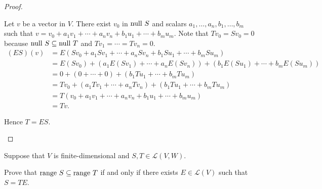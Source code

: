 \begin{proof}
\begin{enumerate}[label={\textbf{Step \arabic*.}},itemindent={1cm}]
              Let $v$ be a vector in $V$. There exist $v_{0}$ in $\operatorname{null}\,{S}$ and scalars $a_{1}, \ldots, a_{n}, b_{1}, \ldots, b_{m}$ such that $v = v_{0} + a_{1}v_{1} + \cdots + a_{n}v_{n} + b_{1}u_{1} + \cdots + b_{m}u_{m}$. Note that $Tv_{0} = Sv_{0} = 0$ because $\operatorname{null}\,{S}\subseteq \operatorname{null}\,{T}$ and $Tv_{1} = \cdots = Tv_{n} = 0$.
              \begin{align*}
                  (ES)(v) & = E(Sv_{0} + a_{1}Sv_{1} + \cdots + a_{n}Sv_{n} + b_{1}Su_{1} + \cdots + b_{m}Su_{m})                 \\
                          & = E(Sv_{0}) + (a_{1}E(Sv_{1}) + \cdots + a_{n}E(Sv_{n})) + (b_{1}E(Su_{1}) + \cdots + b_{m}E(Su_{m})) \\
                          & = 0 + (0 + \cdots + 0) + (b_{1}Tu_{1} + \cdots + b_{m}Tu_{m})                                         \\
                          & = Tv_{0} + (a_{1}Tv_{1} + \cdots + a_{n}Tv_{n}) + (b_{1}Tu_{1} + \cdots + b_{m}Tu_{m})                \\
                          & = T(v_{0} + a_{1}v_{1} + \cdots + a_{n}v_{n} + b_{1}u_{1} + \cdots + b_{m}u_{m})                      \\
                          & = Tv.
              \end{align*}

              Hence $T = ES$.\qedhere
    \end{enumerate}
\end{proof}
\newpage

\begin{exercise}
    Suppose that $V$ is finite-dimensional and $S, T \in \mathcal{L}(V, W)$.

    Prove that $\operatorname{range}\,{S} \subseteq \operatorname{range}\,{T}$ if and only if there exists $E \in \mathcal{L}(V)$ such that $S = TE$.
\end{exercise}

